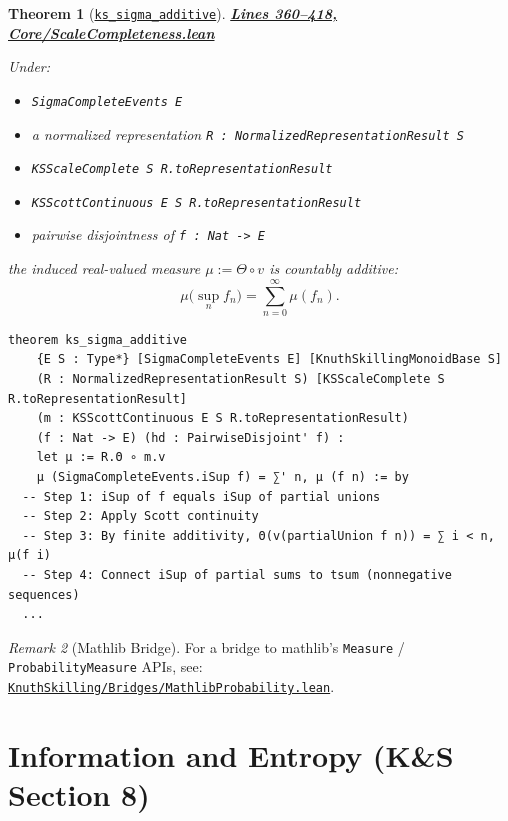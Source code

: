 \documentclass[11pt]{article}
\newtheorem{theorem}{Theorem}[section]
\theoremstyle{definition}
\theoremstyle{remark}
\newtheorem{remark}[theorem]{Remark}
\begin{document}
\begin{theorem}[\href{https://github.com/zariuq/ks-foundations-of-inference/blob/main/KnuthSkilling/Core/ScaleCompleteness.lean\#L360}{\texttt{ks\_sigma\_additive}}]
\textbf{\href{https://github.com/zariuq/ks-foundations-of-inference/blob/main/KnuthSkilling/Core/ScaleCompleteness.lean\#L360-L418}{Lines 360--418, Core/ScaleCompleteness.lean}}

Under:
\begin{itemize}
\item \texttt{SigmaCompleteEvents E}
\item a normalized representation \texttt{R : NormalizedRepresentationResult S}
\item \texttt{KSScaleComplete S R.toRepresentationResult}
\item \texttt{KSScottContinuous E S R.toRepresentationResult}
\item pairwise disjointness of \texttt{f : Nat -> E}
\end{itemize}
the induced real-valued measure $\mu := \Theta \circ v$ is countably additive:
\[
\mu\Big(\sup_n f_n\Big) = \sum_{n=0}^\infty \mu(f_n).
\]
\end{theorem}

\begin{lstlisting}[caption={$\sigma$-additivity theorem (signature)}]
theorem ks_sigma_additive
    {E S : Type*} [SigmaCompleteEvents E] [KnuthSkillingMonoidBase S]
    (R : NormalizedRepresentationResult S) [KSScaleComplete S R.toRepresentationResult]
    (m : KSScottContinuous E S R.toRepresentationResult)
    (f : Nat -> E) (hd : PairwiseDisjoint' f) :
    let μ := R.Θ ∘ m.v
    μ (SigmaCompleteEvents.iSup f) = ∑' n, μ (f n) := by
  -- Step 1: iSup of f equals iSup of partial unions
  -- Step 2: Apply Scott continuity
  -- Step 3: By finite additivity, Θ(v(partialUnion f n)) = ∑ i < n, μ(f i)
  -- Step 4: Connect iSup of partial sums to tsum (nonnegative sequences)
  ...
\end{lstlisting}

\begin{remark}[Mathlib Bridge]
For a bridge to mathlib's \texttt{Measure} / \texttt{ProbabilityMeasure} APIs, see:
\href{https://github.com/zariuq/ks-foundations-of-inference/blob/main/KnuthSkilling/Bridges/MathlibProbability.lean}{\texttt{KnuthSkilling/Bridges/MathlibProbability.lean}}.
\end{remark}

\section{Information and Entropy (K\&S Section 8)}
\end{document}

